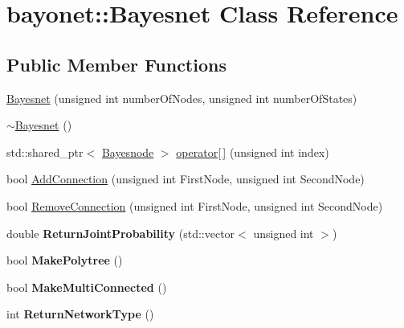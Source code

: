 \hypertarget{classbayonet_1_1_bayesnet}{\section{bayonet\-:\-:Bayesnet Class Reference}
\label{classbayonet_1_1_bayesnet}
}
\subsection*{Public Member Functions}
\begin{DoxyCompactItemize}
\item 
\hyperlink{classbayonet_1_1_bayesnet_a737f36870a5ff30826f205306a3ebaa0}{Bayesnet} (unsigned int number\-Of\-Nodes, unsigned int number\-Of\-States)
\item 
\hyperlink{classbayonet_1_1_bayesnet_af0d3ee29b0676789a3c5d1c33a0e36a2}{$\sim$\-Bayesnet} ()
\item 
std\-::shared\-\_\-ptr$<$ \hyperlink{classbayonet_1_1_bayesnode}{Bayesnode} $>$ \hyperlink{classbayonet_1_1_bayesnet_a805e5513cfef8b16f5f6f38f93aab5db}{operator\mbox{[}$\,$\mbox{]}} (unsigned int index)
\item 
bool \hyperlink{classbayonet_1_1_bayesnet_aca30de1deda07143604927588e2ff470}{Add\-Connection} (unsigned int First\-Node, unsigned int Second\-Node)
\item 
bool \hyperlink{classbayonet_1_1_bayesnet_a73566585e97c08b87160c74796d00bbd}{Remove\-Connection} (unsigned int First\-Node, unsigned int Second\-Node)
\item 
\hypertarget{classbayonet_1_1_bayesnet_a6f8bf99107923f69539eb7c3c8ad1dd2}{double {\bfseries Return\-Joint\-Probability} (std\-::vector$<$ unsigned int $>$)}\label{classbayonet_1_1_bayesnet_a6f8bf99107923f69539eb7c3c8ad1dd2}

\item 
\hypertarget{classbayonet_1_1_bayesnet_af757ecb227c91cc1ab1513ed3fe095c9}{bool {\bfseries Make\-Polytree} ()}\label{classbayonet_1_1_bayesnet_af757ecb227c91cc1ab1513ed3fe095c9}

\item 
\hypertarget{classbayonet_1_1_bayesnet_af9ece9e6faea6c3da9fe927f5b42ff83}{bool {\bfseries Make\-Multi\-Connected} ()}\label{classbayonet_1_1_bayesnet_af9ece9e6faea6c3da9fe927f5b42ff83}

\item 
\hypertarget{classbayonet_1_1_bayesnet_a6a3fa624a2e63c642112e80f6683edc5}{int {\bfseries Return\-Network\-Type} ()}\label{classbayonet_1_1_bayesnet_a6a3fa624a2e63c642112e80f6683edc5}

\end{DoxyCompactItemize}
